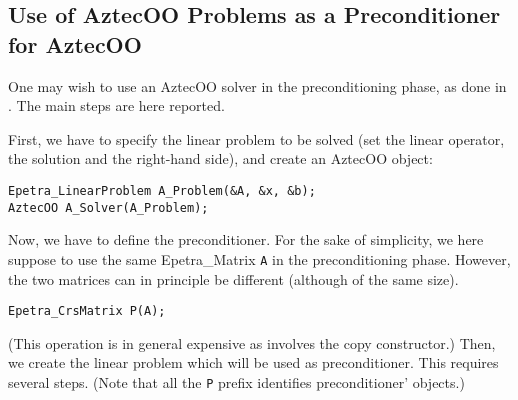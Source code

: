 
\subsection{Use of AztecOO Problems as a Preconditioner for AztecOO}
\label{sec:prec_aztecoo}

One may wish to use an AztecOO solver in the preconditioning phase, as
done in .  The main steps are here reported.

First, we have to specify the linear problem to be solved (set the
linear operator, the solution and the right-hand side), and create an
AztecOO object:
\begin{verbatim}
Epetra_LinearProblem A_Problem(&A, &x, &b);
AztecOO A_Solver(A_Problem);
\end{verbatim}
Now, we have to define the preconditioner. For the sake of simplicity,
we here suppose to use the same Epetra\_Matrix \verb!A! in the
preconditioning phase. However, the two matrices can in principle be
different (although of the same size).
\begin{verbatim}
Epetra_CrsMatrix P(A);
\end{verbatim}
(This operation is in general expensive as involves the copy
constructor.)  Then, we create the linear problem which will be used as
preconditioner.  This requires several steps.  (Note that all the
\verb!P! prefix identifies preconditioner' objects.)
